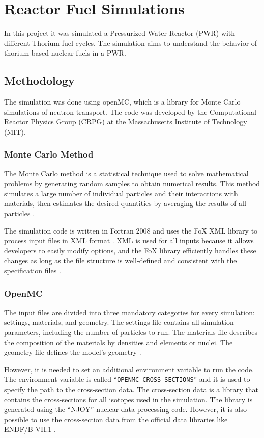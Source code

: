\chapter{Reactor Fuel Simulations}
In this project it was simulated a Pressurized Water Reactor (PWR) with different Thorium fuel cycles. The simulation aims to understand the behavior of thorium based nuclear fuels in a PWR. 

\section{Methodology}
The simulation was done using openMC, which is a library for Monte Carlo simulations of neutron transport. The code was developed by the Computational Reactor Physics Group (CRPG) at the Massachusetts Institute of Technology (MIT). 

\subsection{Monte Carlo Method}
The Monte Carlo method is a statistical technique used to solve mathematical problems by generating random samples to obtain numerical results. This method simulates a large number of individual particles and their interactions with materials, then estimates the desired quantities by averaging the results of all particles \cite{TMSR_book}.

The simulation code is written in Fortran 2008 and uses the FoX XML library to process input files in XML format \cite{OpenMC}. XML is used for all inputs because it allows developers to easily modify options, and the FoX library efficiently handles these changes as long as the file structure is well-defined and consistent with the specification files \cite{OpenMC}.

\subsection{OpenMC}
The input files are divided into three mandatory categories for every simulation: settings, materials, and geometry. The settings file contains all simulation parameters, including the number of particles to run. The materials file describes the composition of the materials by densities and elements or nuclei. The geometry file defines the model's geometry \cite{OpenMC}.

However, it is needed to set an additional environment variable to run the code. The environment variable is called ``\texttt{OPENMC\_CROSS\_SECTIONS}'' and it is used to specify the path to the cross-section data. The cross-section data is a library that contains the cross-sections for all isotopes used in the simulation. The library is generated using the ``NJOY'' nuclear data processing code. However, it is also possible to use the cross-section data from the official data libraries like ENDF/B-VII.1 \cite{OpenMC}.

